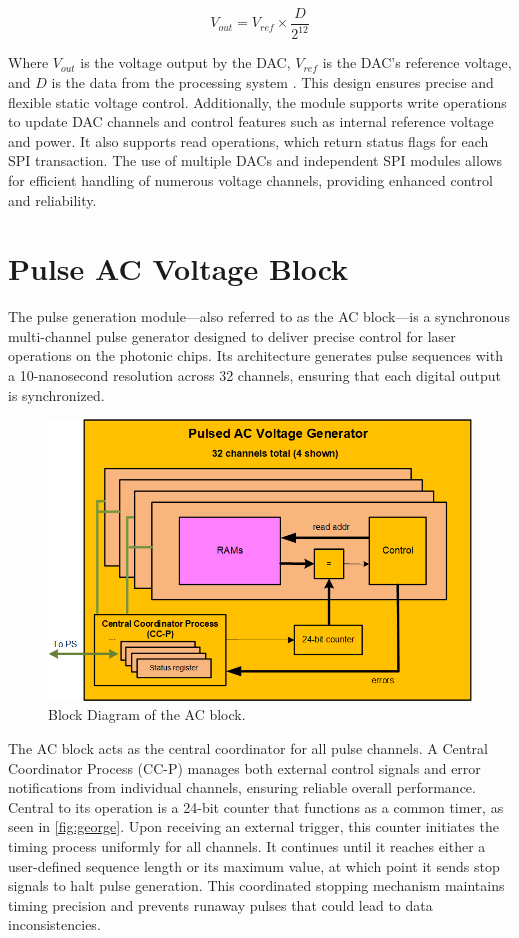 \begin{equation}
V_{out} = V_{ref} \times \frac{D}{2^{12}}
\end{equation}

Where $V_{out}$ is the voltage output by the DAC, $V_{ref}$ is the DAC's reference voltage, and $D$ is the data from the processing system \cite{ad5628}. This design ensures precise and flexible static voltage control. Additionally, the module supports write operations to update DAC channels and control features such as internal reference voltage and power. It also supports read operations, which return status flags for each SPI transaction. The use of multiple DACs and independent SPI modules allows for efficient handling of numerous voltage channels, providing enhanced control and reliability.

\section{Pulse AC Voltage Block}

The pulse generation module—also referred to as the AC block—is a synchronous multi-channel pulse generator designed to deliver precise control for laser operations on the photonic chips. Its architecture generates pulse sequences with a 10-nanosecond resolution across 32 channels, ensuring that each digital output is synchronized. 

\begin{figure}[h]
    \centering
    \includegraphics[width=0.8\linewidth]{figures/5.3.png}
    \caption{Block Diagram of the AC block.}
    \label{fig:george}
\end{figure}
The AC block acts as the central coordinator for all pulse channels. A Central Coordinator Process (CC-P) manages both external control signals and error notifications from individual channels, ensuring reliable overall performance. Central to its operation is a 24-bit counter that functions as a common timer, as seen in \autoref{fig:george}. Upon receiving an external trigger, this counter initiates the timing process uniformly for all channels. It continues until it reaches either a user-defined sequence length or its maximum value, at which point it sends stop signals to halt pulse generation. This coordinated stopping mechanism maintains timing precision and prevents runaway pulses that could lead to data inconsistencies.


